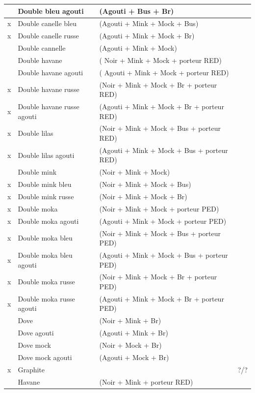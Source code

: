 \documentclass[a4paper,10pt]{article}
\begin{document}
\begin{longtable}{|c|l|l|l|}
& Double bleu agouti  & (Agouti + Bus + Br) & \\\hline
x & Double canelle bleu  & (Agouti + Mink +   Mock + Bus) & \\\hline
x & Double canelle russe  & (Agouti + Mink + Mock + Br) & \\\hline
& Double cannelle  & (Agouti + Mink + Mock) & \\\hline
& Double havane  & ( Noir + Mink + Mock +   porteur RED) & \\\hline
& Double havane agouti  & ( Agouti + Mink +   Mock + porteur RED) & \\\hline
x & Double havane russe  & (Noir + Mink + Mock   + Br + porteur RED) & \\\hline
x & Double havane russe agouti  & (Agouti +   Mink + Mock + Br + porteur RED) & \\\hline
x & Double lilas  & (Noir + Mink + Mock + Bus +   porteur RED) & \\\hline
x & Double lilas agouti  & (Agouti + Mink +   Mock + Bus + porteur RED) & \\\hline
& Double mink  & (Noir + Mink + Mock) & \\\hline
x & Double mink bleu  & (Noir + Mink + Mock +   Bus) & \\\hline
x & Double mink russe  & (Noir + Mink + Mock +   Br) & \\\hline
x & Double moka  & (Noir + Mink + Mock +   porteur PED) & \\\hline
x & Double moka agouti  & (Agouti + Mink + Mock   + porteur PED) & \\\hline
x & Double moka bleu  & (Noir + Mink + Mock +   Bus + porteur PED) & \\\hline
x & Double moka bleu agouti  & (Agouti + Mink +   Mock + Bus + porteur PED) & \\\hline
x & Double moka russe  & (Noir + Mink + Mock +   Br + porteur PED) & \\\hline
x & Double moka russe agouti  & (Agouti + Mink   + Mock + Br + porteur PED) & \\\hline
& Dove  & (Noir + Mink + Br) & \\\hline
& Dove agouti    & (Agouti + Mink + Br) & \\\hline
& Dove mock  & (Noir + Mock + Br) & \\\hline
& Dove mock agouti    & (Agouti + Mock + Br) & \\\hline
x & Graphite & & ?/? \\\hline
& Havane  & (Noir + Mink + porteur RED) & \\\hline

\end{longtable}
\end{document}
